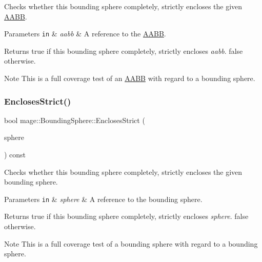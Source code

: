 Checks whether this bounding sphere completely, strictly encloses the given \hyperlink{classmage_1_1_a_a_b_b}{A\+A\+BB}.


\begin{DoxyParams}[1]{Parameters}
\mbox{\tt in}  & {\em aabb} & A reference to the \hyperlink{classmage_1_1_a_a_b_b}{A\+A\+BB}. \\
\hline
\end{DoxyParams}
\begin{DoxyReturn}{Returns}
{\ttfamily true} if this bounding sphere completely, strictly encloses {\itshape aabb}. {\ttfamily false} otherwise. 
\end{DoxyReturn}
\begin{DoxyNote}{Note}
This is a full coverage test of an \hyperlink{classmage_1_1_a_a_b_b}{A\+A\+BB} with regard to a bounding sphere. 
\end{DoxyNote}
\hypertarget{classmage_1_1_bounding_sphere_a8f0fc134762fb9a00b47d62cc09c7703}{}\label{classmage_1_1_bounding_sphere_a8f0fc134762fb9a00b47d62cc09c7703} 
\subsubsection{\texorpdfstring{Encloses\+Strict()}{EnclosesStrict()}\hspace{0.1cm}{\footnotesize\ttfamily [4/4]}}
{\footnotesize\ttfamily bool mage\+::\+Bounding\+Sphere\+::\+Encloses\+Strict (\begin{DoxyParamCaption}\item[{const \hyperlink{classmage_1_1_bounding_sphere}{Bounding\+Sphere} \&}]{sphere }\end{DoxyParamCaption}) const\hspace{0.3cm}{\ttfamily [noexcept]}}

Checks whether this bounding sphere completely, strictly encloses the given bounding sphere.


\begin{DoxyParams}[1]{Parameters}
\mbox{\tt in}  & {\em sphere} & A reference to the bounding sphere. \\
\hline
\end{DoxyParams}
\begin{DoxyReturn}{Returns}
{\ttfamily true} if this bounding sphere completely, strictly encloses {\itshape sphere}. {\ttfamily false} otherwise. 
\end{DoxyReturn}
\begin{DoxyNote}{Note}
This is a full coverage test of a bounding sphere with regard to a bounding sphere. 
\end{DoxyNote}
\hypertarget{classmage_1_1_bounding_sphere_afbdb210289e14ceeb69d62d1d0585b93}{}\label{classmage_1_1_bounding_sphere_afbdb210289e14ceeb69d62d1d0585b93} 
